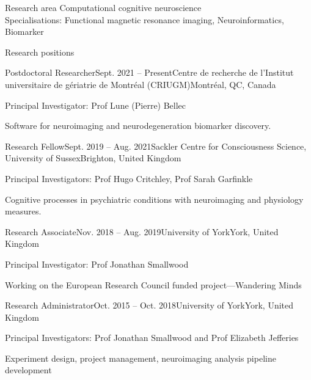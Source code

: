 \documentclass{resume} %
\begin{document}

\begin{rSection}{Research area}
Computational cognitive neuroscience \\ 
Specialisations: 
Functional magnetic resonance imaging, 
Neuroinformatics,
Biomarker
\end{rSection}



\begin{rSection}{Research positions}

  \begin{rSubsection}{Postdoctoral Researcher}{Sept. 2021 -- Present}{Centre de recherche de l'Institut universitaire de g\'eriatrie de Montr\'eal (CRIUGM)}{Montr\'eal, QC, Canada}
    \item Principal Investigator: Prof Lune (Pierre) Bellec
    \item Software for neuroimaging and neurodegeneration biomarker discovery.
  \end{rSubsection}

  \begin{rSubsection}{Research Fellow}{Sept. 2019 -- Aug. 2021}{Sackler Centre for Consciousness Science, University of Sussex}{Brighton, United Kingdom}
    \item Principal Investigators: Prof Hugo Critchley, Prof Sarah Garfinkle
    \item Cognitive processes in psychiatric conditions with neuroimaging and physiology measures.
  \end{rSubsection}

  \begin{rSubsection}{Research Associate}{Nov. 2018 -- Aug. 2019}{University of York}{York, United Kingdom}
  \item Principal Investigator: Prof Jonathan Smallwood
  \item Working on the European Research Council funded project---Wandering Minds
  \end{rSubsection}

  \begin{rSubsection}{Research Administrator}{Oct. 2015 -- Oct. 2018}{University of York}{York, United Kingdom}
    \item Principal Investigators: Prof Jonathan Smallwood and Prof Elizabeth Jefferies
    \item Experiment design, project management, neuroimaging analysis pipeline development
  \end{rSubsection}

  \end{rSection}
\end{document}

